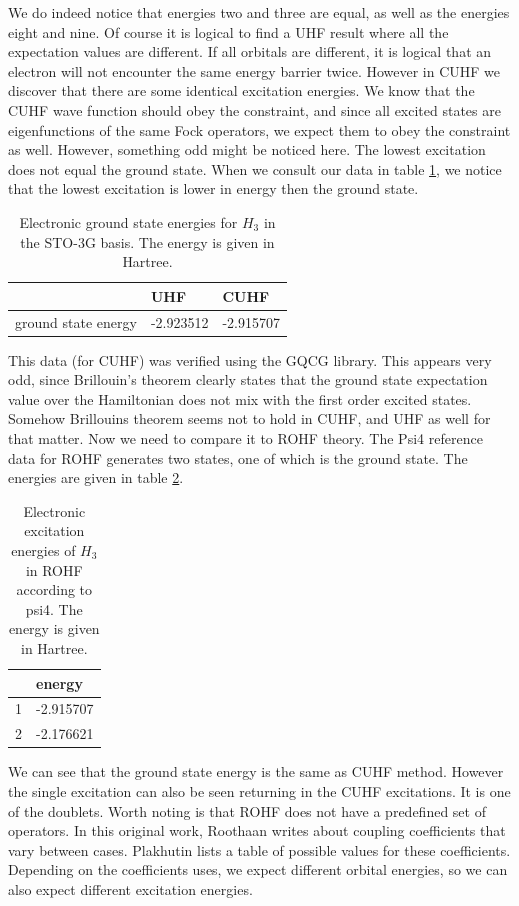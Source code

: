 \documentclass[twoside,twocolumn,9pt]{article}
\begin{document}
We do indeed notice that energies two and three are equal, as well as the energies eight and nine. Of course it is logical to find a UHF result where all the expectation values are
different. If all orbitals are different, it is logical that an electron will not encounter the same energy barrier twice. However in CUHF we discover that there are some identical
excitation energies. We know that the CUHF wave function should obey the constraint, and since all excited states are eigenfunctions of the same Fock operators, we expect them to
obey the constraint as well. However, something odd might be noticed here. The lowest excitation does not equal the ground state. When we consult our data in table 
\ref{tab:ground states}, we notice that the lowest excitation is lower in energy then the ground state.
\begin{table}[h]
  \caption{Electronic ground state energies for $H_3$ in the STO-3G basis. The energy is given in Hartree.}
  \label{tab:ground states}
  \begin{tabular}{l|l|l}
                        & UHF       & CUHF      \\
    \hline
    ground state energy & -2.923512 & -2.915707
  \end{tabular}
\end{table}
This data (for CUHF) was verified using the GQCG library. This appears very odd, since Brillouin's theorem clearly states that the ground state expectation value over the Hamiltonian
does not mix with the first order excited states. Somehow Brillouins theorem seems not to hold in CUHF, and UHF as well for that matter. Now we need to compare it to ROHF theory. 
The Psi4 reference data for ROHF generates two states, one of which is the ground state. The energies are given in table \ref{tab:ROHF}.
\begin{table}[h]
  \caption{Electronic excitation energies of $H_3$ in ROHF according to psi4. The energy is given in Hartree.}
  \label{tab:ROHF}
  \begin{tabular}{l|l}
    & energy \\
    \hline
    1 & -2.915707 \\
    2 & -2.176621
  \end{tabular}
\end{table}
We can see that the ground state energy is the same as CUHF method. However the single excitation can also be seen returning in the CUHF excitations. It is one of the doublets.
Worth noting is that ROHF does not have a predefined set of operators. In this original work, Roothaan writes about coupling coefficients that vary between cases\cite{Roothaan1960}.
Plakhutin lists a table of possible values for these coefficients\cite{Plakhutin2014}. Depending on the coefficients uses, we expect different orbital energies, so we can also
expect different excitation energies.
\end{document}
